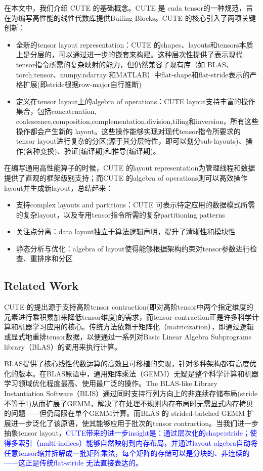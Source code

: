 \documentclass{article}
\begin{document}
在本文中，我们介绍 CUTE 的基础概念。CUTE 是 cuda tensor的一种规范，旨在为编写高性能的线性代数库提供Builing Blocks。CUTE 的核心引入了两项关键创新：
\begin{itemize}
  \item 全新的tensor layout representation：CUTE 的shapes、layouts和tensors本质上是分层的，可以通过进一步的嵌套来构建。这种层次性提供了表示现代tensor指令所需的复杂映射的能力，但仍然兼容了现有库（如 BLAS、torch.tensor、numpy.ndarray 和MATLAB）中flat-shape和flat-stride表示的严格扩展(即stride根据row-major自行推断)
  \item 定义在tensor layout上的algebra of operations：CUTE layout支持丰富的操作集合，包括concatenation, coalescence,composition,complementation,division,tiling和inversion，所有这些操作都会产生新的 layout。这些操作能够实现对现代tensor指令所要求的tensor layout进行复杂的分区(源于其分层特性，即可以划分sub-layouts)、操作(各种变换)、验证(编译期)和推导(编译期)。
\end{itemize}
在编写通用高性能算子的时候，CUTE 的layout representation为管理线程和数据提供了直观的框架级别支持；而CUTE 的algebra of operations则可以高效操作layout并生成新layout，总结起来： 

\begin{itemize}
    \item 支持complex layouts and partitions：CUTE 可表示特定应用的数据模式所需的复杂layout，以及专用tensor指令所需的复杂partitioning patterns 
    \item 关注点分离：data layout独立于算法逻辑声明，提升了清晰性和模块性
    \item 静态分析与优化：algebra of layout使得能够根据架构约束对tensor参数进行检查、重排序和分区
\end{itemize}

\subsection{Related Work}

CUTE 的提出源于支持高阶tensor contraction(即对高阶tensor中两个指定维度的元素进行乘积累加来降低tensor维度)的需求，而tensor contraction正是许多科学计算和机器学习应用的核心。传统方法依赖于矩阵化（matricization），即通过逻辑或显式地重排tensor数据，以便通过一系列对Basic Linear Algebra Subprograms library（BLAS）的调用来执行计算。

BLAS提供了核心线性代数运算的高效且可移植的实现，针对多种架构都有高度优化的版本。在BLAS原语中，通用矩阵乘法（GEMM）无疑是整个科学计算和机器学习领域优化程度最高、使用最广泛的操作。The BLAS-like Library Instantiation Software（BLIS）通过同时支持行列方向上的非连续存储布局(stride不等于1)从而扩展了GEMM，解决了在处理不规则内存布局时无需显式内存拷贝的问题——但仍局限在单个GEMM计算。而BLAS 的 strided-batched GEMM 扩展进一步泛化了该原语，使其能够应用于批次的tensor contraction。当我们进一步抽象tensor layout，\textcolor{blue}{CUTE带来的进一步insight是：通过层次化的shape:stride；使得多索引（multi-indices）能够自然映射到内存布局，并通过layout algebra自动将任意tensor缩并拆解成一批矩阵乘法，每个矩阵的存储可以是分块的、非连续的——这正是传统flat-stride 无法直接表达的。}
\end{document}
